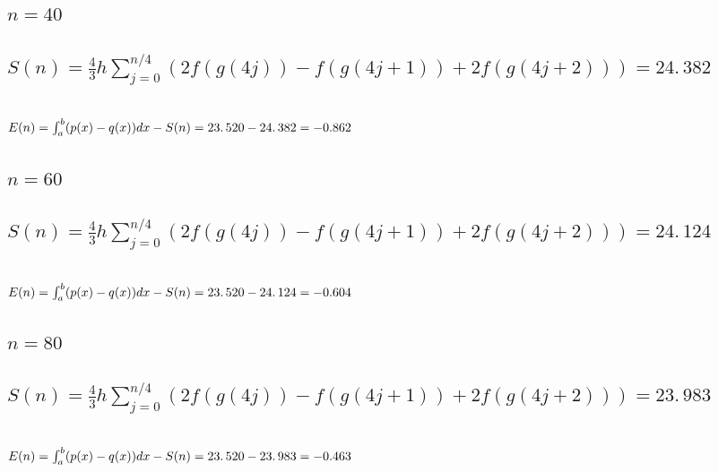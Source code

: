 \documentclass{article}
\begin{document}
\subsection{$n=40$}

\subsection{$S(n)=\frac{4}{3}h\sum%
\limits_{j=0}^{n/4}(2f(g(4j))-f(g(4j+1))+2f(g(4j+2)))=\allowbreak
24.\,\allowbreak 382$}

\subsection{$E(n)=\protect\int_{a}^{b}(p(x)-q(x))dx\allowbreak
-S(n)=23.\,\allowbreak 520-\allowbreak \allowbreak 24.\,\allowbreak
382=\allowbreak -0.862\,$}

\bigskip

\subsection{$n=60$}

\subsection{$S(n)=\frac{4}{3}h\sum%
\limits_{j=0}^{n/4}(2f(g(4j))-f(g(4j+1))+2f(g(4j+2)))=24.\,\allowbreak 124$}

\subsection{$E(n)=\protect\int_{a}^{b}(p(x)-q(x))dx\allowbreak
-S(n)=\allowbreak \allowbreak 23.\,\allowbreak 520-24.\,\allowbreak
124=-\allowbreak 0.604\,$}

\bigskip

\subsection{$n=80$}

\subsection{$S(n)=\frac{4}{3}h\sum%
\limits_{j=0}^{n/4}(2f(g(4j))-f(g(4j+1))+2f(g(4j+2)))=23.\,\allowbreak 983$}

\subsection{\protect\bigskip $E(n)=\protect\int_{a}^{b}(p(x)-q(x))dx%
\allowbreak -S(n)=23.\,\allowbreak 520-23.\,\allowbreak 983=-\allowbreak
0.463\,$}
\end{document}
